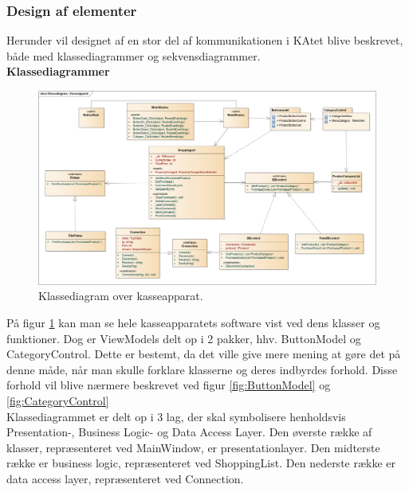 \subsubsection{Design af elementer}
Herunder vil designet af en stor del af kommunikationen i \gls{KA}tet blive beskrevet, både med klassediagrammer og sekvensdiagrammer.\\

\textbf{Klassediagrammer}\\

\begin{figure}[H]
	\centering
	\includegraphics[width=1.2\textwidth, angle=90]{Systemdesign/Frontend/GUI/DesignOgStruktur/Pics/KlassediagramKasseApparat}
	\caption{Klassediagram over kasseapparat.}
	\label{fig:KasseKlasse}
\end{figure}

På figur \ref{fig:KasseKlasse} kan man se hele kasseapparatets software vist ved dens klasser og funktioner. Dog er ViewModels delt op i 2 pakker, hhv. ButtonModel og CategoryControl. Dette er bestemt, da det ville give mere mening at gøre det på denne måde, når man skulle forklare klasserne og deres indbyrdes forhold. Disse forhold vil blive nærmere beskrevet ved figur \ref{fig:ButtonModel} og \ref{fig:CategoryControl} \\
Klassediagrammet er delt op i 3 lag, der skal symbolisere henholdsvis Presentation-, Business Logic- og Data Access Layer. Den øverste række af klasser, repræsenteret ved MainWindow, er presentationlayer. Den midterste række er business logic, repræsenteret ved ShoppingList. Den nederste række er data access layer, repræsenteret ved Connection.

